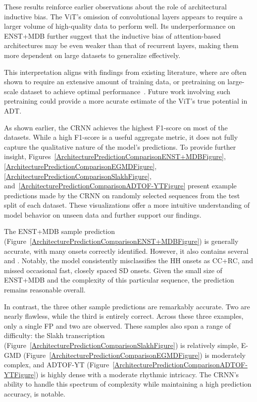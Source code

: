 These results reinforce earlier observations about the role of architectural inductive bias. The \gls{ViT}'s omission of convolutional layers appears to require a larger volume of high-quality data to perform well. Its underperformance on ENST+MDB further suggest that the inductive bias of attention-based architectures may be even weaker than that of recurrent layers, making them more dependent on large datasets to generalize effectively. 

This interpretation aligns with findings from existing literature, where  are often shown to require an extensive amount of training data, or pretraining on large-scale dataset to achieve optimal performance~\cite{dosovitskiy2021imageworth16x16words}. Future work involving such pretraining could provide a more acurate estimate of the \gls{ViT}'s true potential in \gls{ADT}.

As shown earlier, the \acrfull{CRNN} achieves the highest F1-score on most of the datasets. While a high F1-score is a useful aggregate metric, it does not fully capture the qualitative nature of the model's predictions. To provide further insight, Figures~\ref{ArchitecturePredictionComparisonENST+MDBFigure}, \ref{ArchitecturePredictionComparisonEGMDFigure}, \ref{ArchitecturePredictionComparisonSlakhFigure}, and~\ref{ArchitecturePredictionComparisonADTOF-YTFigure} present example predictions made by the \gls{CRNN} on randomly selected sequences from the test split of each dataset. These visualizations offer a more intuitive understanding of model behavior on unseen data and further support our findings.

The ENST+MDB sample prediction (Figure~\ref{ArchitecturePredictionComparisonENST+MDBFigure}) is generally accurate, with many onsets correctly identified. However, it also contains several  and . Notably, the model consistently misclassifies the \acrfull{HH} onsets as \acrfull{CC+RC}, and missed occasional fast, closely spaced \acrfull{SD} onsets. Given the small size of ENST+MDB and the complexity of this particular sequence, the prediction remains reasonable overall.

In contrast, the three other sample predictions are remarkably accurate. Two are nearly flawless, while the third is entirely correct. Across these three examples, only a single \acrshort{FP} and two  are observed. These samples also span a range of difficulty: the Slakh transcription (Figure~\ref{ArchitecturePredictionComparisonSlakhFigure}) is relatively simple, E-GMD (Figure~\ref{ArchitecturePredictionComparisonEGMDFigure}) is moderately complex, and ADTOF-YT (Figure~\ref{ArchitecturePredictionComparisonADTOF-YTFigure}) is highly dense with a moderate rhythmic intricacy. The \gls{CRNN}'s ability to handle this spectrum of complexity while maintaining a high prediction accuracy, is notable.

